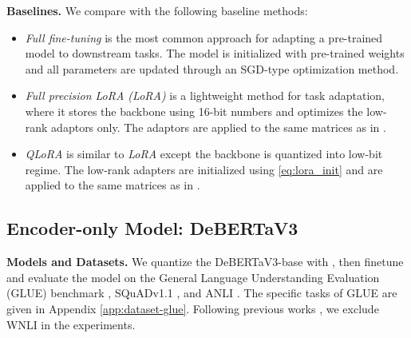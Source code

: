 \noindent \textbf{Baselines.} We compare {\OurAlg} with the following baseline methods: 
\begin{itemize}
    \item \textit{Full fine-tuning} is the most common approach for adapting a pre-trained model to downstream tasks. The model is initialized with pre-trained weights and all parameters are updated through an SGD-type optimization method. 
    \item \textit{Full precision LoRA (LoRA)} is a lightweight method for task adaptation, where it stores the backbone using 16-bit numbers and optimizes the low-rank adaptors only. The adaptors are applied to the same matrices as in {\OurAlg}. %
    \item \textit{QLoRA} is similar to \textit{LoRA} except the backbone is quantized into low-bit regime. The low-rank adapters are initialized using \eqref{eq:lora_init} and are applied to the same matrices as in {\OurAlg}.%
\end{itemize}



\subsection{Encoder-only Model: DeBERTaV3}

\textbf{Models and Datasets.}
We quantize the DeBERTaV3-base \citep{he2021debertav3} with {\OurAlg}, then finetune and evaluate the model on the General Language Understanding Evaluation (GLUE) benchmark \citep{wang2018glue}, SQuADv1.1 \citep{rajpurkar-etal-2016-squad}, and ANLI \citep{Nie2019AdversarialNA}. The specific tasks of GLUE are given in Appendix \ref{app:dataset-glue}. Following previous works \citep{zhang2023adaptive}, we exclude WNLI in the experiments.

